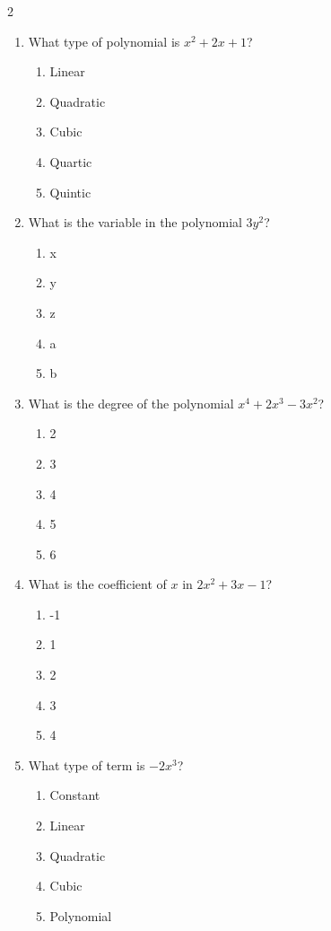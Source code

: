 \documentclass[10pt]{article}
\begin{document}
\begin{multicols}{2}
\begin{enumerate}[label=\textbf{Q\arabic*.}, leftmargin=*, itemsep=6pt, parsep=0pt]
  \item \small What type of polynomial is $x^2 + 2x + 1$?
  \begin{enumerate}[label=(\Alph*), leftmargin=0.6cm, nosep, itemsep=2pt]
    \item Linear
    \item Quadratic
    \item Cubic
    \item Quartic
    \item Quintic
  \end{enumerate}

  \item \small What is the variable in the polynomial $3y^2$?
  \begin{enumerate}[label=(\Alph*), leftmargin=0.6cm, nosep, itemsep=2pt]
    \item x
    \item y
    \item z
    \item a
    \item b
  \end{enumerate}

  \item \small What is the degree of the polynomial $x^4 + 2x^3 - 3x^2$?
  \begin{enumerate}[label=(\Alph*), leftmargin=0.6cm, nosep, itemsep=2pt]
    \item 2
    \item 3
    \item 4
    \item 5
    \item 6
  \end{enumerate}

  \item \small What is the coefficient of $x$ in $2x^2 + 3x - 1$?
  \begin{enumerate}[label=(\Alph*), leftmargin=0.6cm, nosep, itemsep=2pt]
    \item -1
    \item 1
    \item 2
    \item 3
    \item 4
  \end{enumerate}

  \item \small What type of term is $-2x^3$?
  \begin{enumerate}[label=(\Alph*), leftmargin=0.6cm, nosep, itemsep=2pt]
    \item Constant
    \item Linear
    \item Quadratic
    \item Cubic
    \item Polynomial
  \end{enumerate}

\end{enumerate}
\end{multicols}
\end{document}
